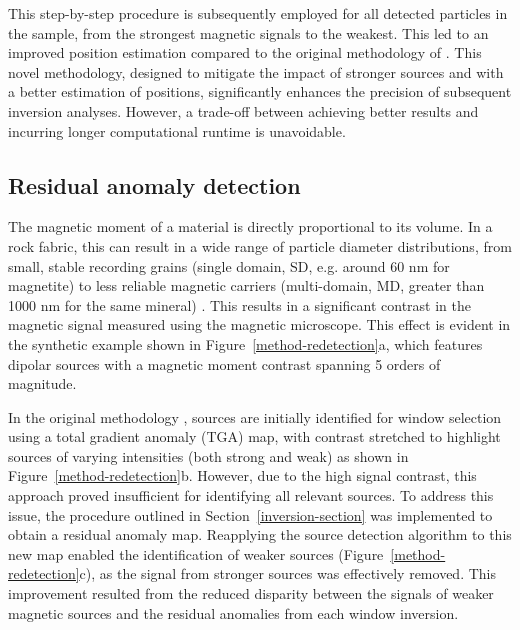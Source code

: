     This step-by-step procedure is subsequently employed for all detected particles in the sample, from the strongest magnetic signals to the weakest. This led to an improved position estimation compared to the original methodology of \citep{Souza-Junior2024}. This novel methodology, designed to mitigate the impact of stronger sources and with a better estimation of positions, significantly enhances the precision of subsequent inversion analyses. However, a trade-off between achieving better results and incurring longer computational runtime is unavoidable.

\subsection{Residual anomaly detection}

   The magnetic moment of a material is directly proportional to its volume. In a rock fabric, this can result in a wide range of particle diameter distributions, from small, stable recording grains (single domain, SD, e.g. around 60 nm for magnetite) to less reliable magnetic carriers (multi-domain, MD, greater than 1000 nm for the same mineral) \citep{Nagy2019}. This results in a significant contrast in the magnetic signal measured using the magnetic microscope. This effect is evident in the synthetic example shown in Figure~\ref{method-redetection}a, which features dipolar sources with a magnetic moment contrast spanning 5 orders of magnitude. 
   
    In the original methodology \citep{Souza-Junior2024}, sources are initially identified for window selection using a total gradient anomaly (TGA) map, with contrast stretched to highlight sources of varying intensities (both strong and weak) as shown in Figure~\ref{method-redetection}b. However, due to the high signal contrast, this approach proved insufficient for identifying all relevant sources. To address this issue, the procedure outlined in Section~\ref{inversion-section} was implemented to obtain a residual anomaly map. Reapplying the source detection algorithm to this new map enabled the identification of weaker sources (Figure~\ref{method-redetection}c), as the signal from stronger sources was effectively removed. This improvement resulted from the reduced disparity between the signals of weaker magnetic sources and the residual anomalies from each window inversion.

